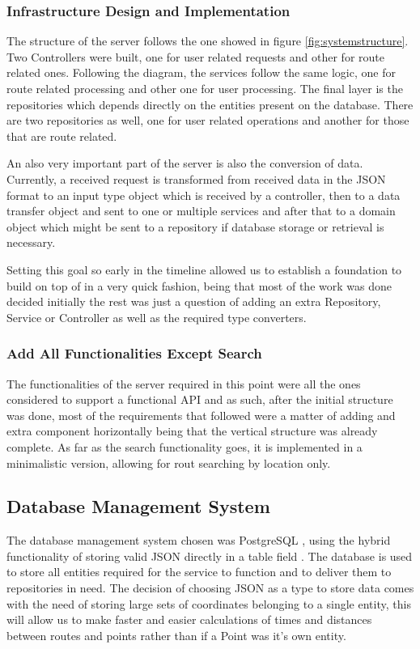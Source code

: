 \documentclass{article}
\begin{document}
            \subsubsection*{Infrastructure Design and Implementation}
            The structure of the server follows the one showed in figure \ref{fig:systemstructure}. 
            Two Controllers were built, one for user related requests and other for route related ones. Following the diagram, the services follow the same logic, one for route related 
            processing and other one for user processing. The final layer is the repositories which depends directly on the entities present on the database. There are two repositories as well,
            one for user related operations and another for those that are route related.\par
            An also very important part of the server is also the conversion of data. Currently, a received request is transformed from received data in the JSON format to an input type object which is received by a controller, then to a data 
            transfer object and sent to one or multiple services and after that to a domain object which might be sent to a repository if database storage or retrieval is necessary.

            Setting this goal so early in the timeline allowed us to establish a foundation to build on top of in a very quick fashion, being that most of the work was done decided initially the rest 
            was just a question of adding an extra Repository, Service or Controller as well as the required type converters. 

            \subsubsection*{Add All Functionalities Except Search}
            The functionalities of the server required in this point were all the ones considered to support a functional API and as such, after the initial structure was done, most of the requirements
            that followed were a matter of adding and extra component horizontally being that the vertical structure was already complete. As far as the search functionality goes, it is implemented in 
            a minimalistic version, allowing for rout searching by location only.

            \newpage

        \subsection{Database Management System}
            The database management system chosen was PostgreSQL \cite{postgresql}, using the hybrid functionality of storing valid JSON directly in a table field \cite{postgresqljson}. The database is used to store
            all entities required for the service to function and to deliver them to repositories in need. 
            The decision of choosing JSON as a type to store data comes with the need of storing large sets of coordinates belonging to a single entity, this will allow us to 
            make faster and easier calculations of times and distances between routes and points rather than if a Point was it's own entity. 
\end{document}
